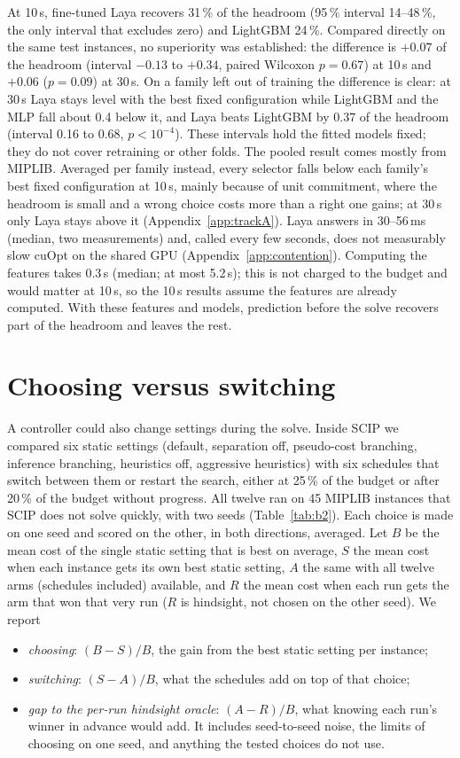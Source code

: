 \documentclass[11pt]{article}
\begin{document}
At 10\,s, fine-tuned Laya recovers 31\,\% of the headroom (95\,\% interval 14--48\,\%, the only interval that excludes
zero) and LightGBM 24\,\%. Compared directly on the same test instances, no superiority was established: the difference is
$+0.07$ of the headroom (interval $-0.13$ to $+0.34$, paired Wilcoxon $p=0.67$) at 10\,s and $+0.06$ ($p=0.09$) at
30\,s. On a family left out of training the difference is clear: at 30\,s Laya stays level with the best fixed
configuration while LightGBM and the MLP fall about 0.4 below it, and Laya beats LightGBM by 0.37 of the headroom
(interval 0.16 to 0.68, $p<10^{-4}$). These intervals hold the fitted models fixed; they do not cover retraining or
other folds. The pooled result comes mostly from MIPLIB. Averaged per family instead, every selector falls below each
family's best fixed configuration at 10\,s, mainly because of unit commitment, where the headroom is small and a wrong
choice costs more than a right one gains; at 30\,s only Laya stays above it (Appendix~\ref{app:trackA}). Laya answers
in 30--56\,ms (median, two measurements) and, called every few seconds, does not measurably slow cuOpt on the shared GPU
(Appendix~\ref{app:contention}). Computing the features takes 0.3\,s (median; at most 5.2\,s); this is not charged to
the budget and would matter at 10\,s, so the 10\,s results assume the features are already computed. With these
features and models, prediction before the solve recovers part of the headroom and leaves the rest.


\section{Choosing versus switching}\label{sec:switch}
A controller could also change settings during the solve. Inside SCIP we compared six static settings (default,
separation off, pseudo-cost branching, inference branching, heuristics off, aggressive heuristics) with six schedules
that switch between them or restart the search, either at 25\,\% of the budget or after 20\,\% of the budget without
progress. All twelve ran on 45 MIPLIB instances that SCIP does not solve quickly, with two seeds (Table~\ref{tab:b2}).
Each choice is made on one seed and scored on the other, in both directions, averaged. Let $B$ be the mean cost of the
single static setting that is best on average, $S$ the mean cost when each instance gets its own best static setting,
$A$ the same with all twelve arms (schedules included) available, and $R$ the mean cost when each run gets the arm
that won that very run ($R$ is hindsight, not chosen on the other seed). We report
\begin{itemize}
\item \emph{choosing}: $(B-S)/B$, the gain from the best static setting per instance;
\item \emph{switching}: $(S-A)/B$, what the schedules add on top of that choice;
\item \emph{gap to the per-run hindsight oracle}: $(A-R)/B$, what knowing each run's winner in advance would add.
  It includes seed-to-seed noise, the limits of choosing on one seed, and anything the tested choices do not use.
\end{itemize}
\end{document}
